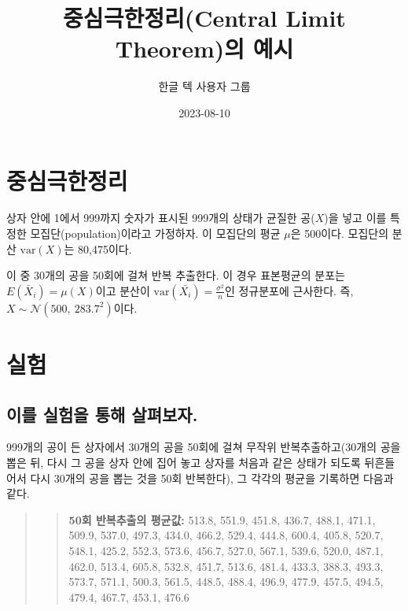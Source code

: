 \documentclass[
  chapter,a4paper,showtrims,openright,hidelinks]{oblivoir}
\title{중심극한정리(Central Limit Theorem)의 예시}
\author{한글 텍 사용자 그룹}
\date{2023-08-10}
\renewcommand*\contentsname{목 차}
\newcommand\contentsname{목 차}
\begin{document}
\maketitle
\ifdefined\Shaded\renewenvironment{Shaded}{\begin{tcolorbox}[frame hidden, sharp corners, enhanced, boxrule=0pt, interior hidden, breakable, borderline west={3pt}{0pt}{shadecolor}]}{\end{tcolorbox}}\fi

\renewcommand*\contentsname{목 차}
{
\hypersetup{linkcolor=}
\setcounter{tocdepth}{2}
\tableofcontents
}
\mainmatter
\pagestyle{demo}

\hypertarget{uxc911uxc2ecuxadf9uxd55cuxc815uxb9ac}{%
\chapter{중심극한정리}\label{uxc911uxc2ecuxadf9uxd55cuxc815uxb9ac}}

상자 안에 1에서 999까지 숫자가 표시된 999개의 상태가 균질한 공(\(X\))을
넣고 이를 특정한 모집단(population)이라고
가정하자. 이 모집단의 평균 \(\mu\)은
500이다. 모집단의 분산 \(\mathrm{var}(X)\)는
80,475이다.

이 중 30개의 공을 50회에 걸쳐 반복 추출한다. 이 경우
표본평균의 분포는 \(E(\bar{X}_i)=\mu(X)\)이고 분산이
\(\mathrm{var}(\bar{X_i})=\frac{\sigma^2}{n}\)인 정규분포에 근사한다.
즉, \(X \sim \mathcal{N}(500,~283.7^2)\)이다.

\hypertarget{uxc2e4uxd5d8}{%
\chapter{실험}\label{uxc2e4uxd5d8}}

\hypertarget{uxc774uxb97c-uxc2e4uxd5d8uxc744-uxd1b5uxd574-uxc0b4uxd3b4uxbcf4uxc790.}{%
\section{이를 실험을 통해
살펴보자.}\label{uxc774uxb97c-uxc2e4uxd5d8uxc744-uxd1b5uxd574-uxc0b4uxd3b4uxbcf4uxc790.}}

999개의 공이 든 상자에서 30개의 공을 50회에 걸쳐 무작위
반복추출하고(30개의 공을 뽑은 뒤, 다시 그 공을 상자 안에 집어 놓고
상자를 처음과 같은 상태가 되도록 뒤흔들어서 다시 30개의 공을 뽑는 것을
50회 반복한다), 그 각각의 평균을 기록하면 다음과
같다.

\begin{quote}
\begin{quote}
\textbf{50회 반복추출의 평균값:} 513.8, 551.9, 451.8, 436.7, 488.1,
471.1, 509.9, 537.0, 497.3, 434.0, 466.2, 529.4, 444.8, 600.4, 405.8,
520.7, 548.1, 425.2, 552.3, 573.6, 456.7, 527.0, 567.1, 539.6, 520.0,
487.1, 462.0, 513.4, 605.8, 532.8, 451.7, 513.6, 481.4, 433.3, 388.3,
493.3, 573.7, 571.1, 500.3, 561.5, 448.5, 488.4, 496.9, 477.9, 457.5,
494.5, 479.4, 467.7, 453.1, 476.6
\end{quote}
\end{quote}
\end{document}
